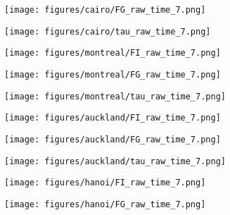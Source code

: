 \documentclass[a4paper]{article}
\def\lthtmlcheckvsize{\ifdim\ht\sizebox<\vsize 
  \ifdim\wd\sizebox<\hsize\expandafter\hfill\fi \expandafter\vfill
  \else\expandafter\vss\fi}%
\begin{document}
{\newpage\clearpage
{}%
\texttt{[image: figures/cairo/FG\_raw\_time\_7.png]}%
\lthtmlpictureZ
\lthtmlcheckvsize\clearpage}

{\newpage\clearpage
{}%
\texttt{[image: figures/cairo/tau\_raw\_time\_7.png]}%
\lthtmlpictureZ
\lthtmlcheckvsize\clearpage}

{\newpage\clearpage
{}%
\texttt{[image: figures/montreal/FI\_raw\_time\_7.png]}%
\lthtmlpictureZ
\lthtmlcheckvsize\clearpage}

{\newpage\clearpage
{}%
\texttt{[image: figures/montreal/FG\_raw\_time\_7.png]}%
\lthtmlpictureZ
\lthtmlcheckvsize\clearpage}

{\newpage\clearpage
{}%
\texttt{[image: figures/montreal/tau\_raw\_time\_7.png]}%
\lthtmlpictureZ
\lthtmlcheckvsize\clearpage}

{\newpage\clearpage
{}%
\texttt{[image: figures/auckland/FI\_raw\_time\_7.png]}%
\lthtmlpictureZ
\lthtmlcheckvsize\clearpage}

{\newpage\clearpage
{}%
\texttt{[image: figures/auckland/FG\_raw\_time\_7.png]}%
\lthtmlpictureZ
\lthtmlcheckvsize\clearpage}

{\newpage\clearpage
{}%
\texttt{[image: figures/auckland/tau\_raw\_time\_7.png]}%
\lthtmlpictureZ
\lthtmlcheckvsize\clearpage}

{\newpage\clearpage
{}%
\texttt{[image: figures/hanoi/FI\_raw\_time\_7.png]}%
\lthtmlpictureZ
\lthtmlcheckvsize\clearpage}

{\newpage\clearpage
{}%
\texttt{[image: figures/hanoi/FG\_raw\_time\_7.png]}%
\lthtmlpictureZ
\lthtmlcheckvsize\clearpage}
\end{document}
